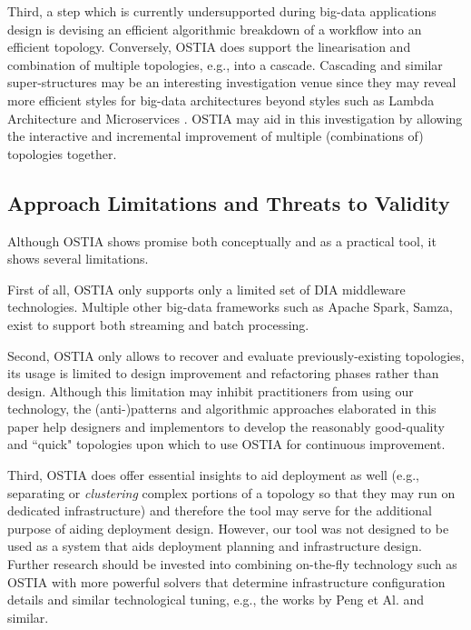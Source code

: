 Third, a step which is currently undersupported during big-data applications design is devising an efficient algorithmic breakdown of a workflow into an efficient topology. Conversely, OSTIA does support the linearisation and combination of multiple topologies, e.g., into a cascade. Cascading and similar super-structures may be an interesting investigation venue since they may reveal more efficient styles for big-data architectures beyond styles such as Lambda Architecture \cite{lambda} and Microservices \cite{balalaie2016microservices}. OSTIA may aid in this investigation by allowing the interactive and incremental improvement of multiple (combinations of) topologies together.

\subsection{Approach Limitations and Threats to Validity}\label{lim}

Although OSTIA shows promise both conceptually and as a practical tool, it shows several limitations.

First of all, OSTIA only supports only a limited set of DIA middleware technologies. Multiple other big-data frameworks such as Apache Spark, Samza, exist to support both streaming and batch processing. 

Second, OSTIA only allows to recover and evaluate previously-existing topologies, its usage is limited to design improvement and refactoring phases rather than design. Although this limitation may inhibit practitioners from using our technology, the (anti-)patterns and algorithmic approaches elaborated in this paper help designers and implementors to develop the reasonably good-quality and ``quick" topologies upon which to use OSTIA for continuous improvement.

Third, OSTIA does offer essential insights to aid deployment as well (e.g., separating or \emph{clustering} complex portions of a topology so that they may run on dedicated infrastructure) and therefore the tool may serve for the additional purpose of aiding deployment design. However, our tool was not designed to be used as a system that aids deployment planning and infrastructure design. Further research should be invested into combining on-the-fly technology such as OSTIA with more powerful solvers that determine infrastructure configuration details and similar technological tuning, e.g., the works by Peng et Al. \cite{PengGWRYC14} and similar.

